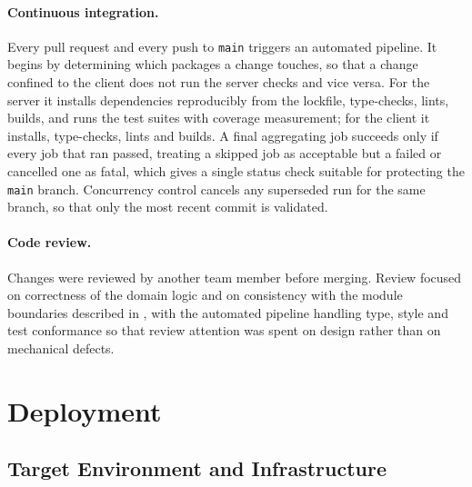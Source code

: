 \paragraph{Continuous integration.}
Every pull request and every push to \texttt{main} triggers an automated
pipeline. It begins by determining which packages a change touches, so that a
change confined to the client does not run the server checks and vice versa. For
the server it installs dependencies reproducibly from the lockfile, type-checks,
lints, builds, and runs the test suites with coverage measurement; for the client
it installs, type-checks, lints and builds. A final aggregating job succeeds only
if every job that ran passed, treating a skipped job as acceptable but a failed
or cancelled one as fatal, which gives a single status check suitable for
protecting the \texttt{main} branch. Concurrency control cancels any superseded
run for the same branch, so that only the most recent commit is validated.

\paragraph{Code review.}
Changes were reviewed by another team member before merging. Review focused on
correctness of the domain logic and on consistency with the module boundaries
described in , with the automated pipeline handling type,
style and test conformance so that review attention was spent on design rather
than on mechanical defects.


\section{Deployment}
\label{sec:deployment}

\subsection{Target Environment and Infrastructure}
\label{subsec:target-environment}


